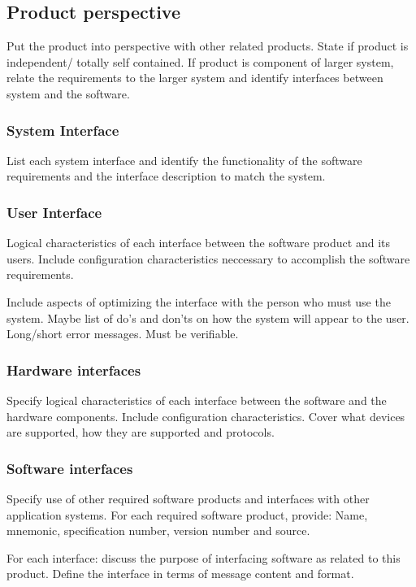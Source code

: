 \documentclass[10pt]{article}
\begin{document}
     \subsection{Product perspective}
     Put the product into perspective with other related products. State if product is independent/ totally self contained. If product is component of larger system, relate the requirements to the larger system and identify interfaces between system and the software.

          \subsubsection{System Interface}
	  List each system interface and identify the functionality of the software requirements and the interface description to match the system.
	  
	  \subsubsection{User Interface}
	  Logical characteristics of each interface between the software product and its users. Include configuration characteristics neccessary to accomplish the software requirements.
	  
	  Include aspects of optimizing the interface with the person who must use the system. Maybe list of do's and don'ts on how the system will appear to the user. Long/short error messages. Must be verifiable. 
	  
	  \subsubsection{Hardware interfaces}
	  Specify logical characteristics of each interface between the software and the hardware components. Include configuration characteristics. Cover what devices are supported, how they are supported and protocols.
	  
	  \subsubsection{Software interfaces}
	  Specify use of other required software products and interfaces with other application systems. For each required software product, provide: Name, mnemonic, specification number, version number and source.

	  For each interface: discuss the purpose of interfacing software as related to this product. Define the interface in terms of message content and format. 
\end{document}
